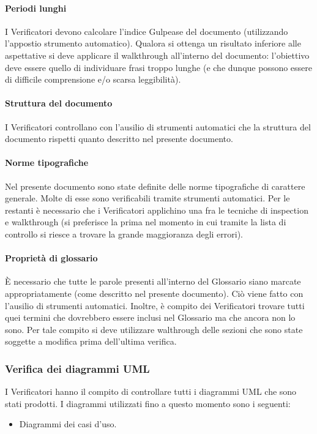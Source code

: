 			\paragraph{Periodi lunghi}
				I Verificatori devono calcolare l'indice Gulpease del documento (utilizzando l'appostio strumento automatico). Qualora si ottenga un 
				risultato inferiore alle aspettative si deve applicare il walkthrough all'interno del documento: l'obiettivo deve essere quello di 
				individuare frasi troppo lunghe (e che dunque possono essere di difficile comprensione e/o scarsa leggibilità).
			\paragraph{Struttura del documento}
				I Verificatori controllano con l'ausilio di strumenti automatici che la struttura del documento rispetti quanto descritto nel presente 
				documento.
			\paragraph{Norme tipografiche}
				Nel presente documento sono state definite delle norme tipografiche di carattere generale. Molte di esse sono verificabili tramite 
				strumenti automatici. Per le restanti è necessario che i Verificatori applichino una fra le tecniche di inspection e walkthrough 
				(si preferisce la prima nel momento in cui tramite la lista di controllo si riesce a trovare la grande maggioranza degli errori).
			\paragraph{Proprietà di glossario}
				È necessario che tutte le parole presenti all'interno del Glossario siano marcate appropriatamente (come descritto nel presente 
				documento). Ciò viene fatto con l'ausilio di strumenti automatici. Inoltre, è compito dei Verificatori trovare tutti quei termini che 
				dovrebbero essere inclusi nel Glossario ma che ancora non lo sono. Per tale compito si deve utilizzare walthrough delle sezioni che sono 
				state soggette a modifica prima dell'ultima verifica.
		\subsubsection{Verifica dei diagrammi UML}
			I Verificatori hanno il compito di controllare tutti i diagrammi UML che sono stati prodotti. I diagrammi utilizzati fino a questo momento 
			sono i seguenti:
			\begin{itemize}
				\item Diagrammi dei casi d'uso.
			\end{itemize}
